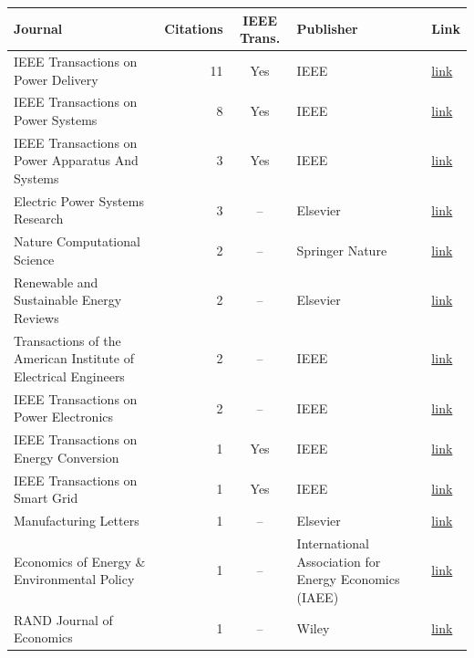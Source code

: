 \begin{table}[htbp]
\centering
\small
\begin{tabular}{lrcll}
\toprule
Journal & Citations & IEEE Trans. & Publisher & Link \\
\midrule
    IEEE Transactions on Power Delivery & 11 & Yes & IEEE & \href{https://ieeexplore.ieee.org/xpl/RecentIssue.jsp?punumber=61}{link} \\
    IEEE Transactions on Power Systems & 8 & Yes & IEEE & \href{https://ieeexplore.ieee.org/xpl/RecentIssue.jsp?punumber=59}{link} \\
    IEEE Transactions on Power Apparatus And Systems & 3 & Yes & IEEE & \href{https://ieeexplore.ieee.org/xpl/RecentIssue.jsp?punumber=6115846}{link} \\
    Electric Power Systems Research & 3 & -- & Elsevier & \href{https://www.sciencedirect.com/journal/electric-power-systems-research}{link} \\
    Nature Computational Science & 2 & -- & Springer Nature & \href{https://www.nature.com/natcomputsci/}{link} \\
    Renewable and Sustainable Energy Reviews & 2 & -- & Elsevier & \href{https://www.sciencedirect.com/journal/renewable-and-sustainable-energy-reviews}{link} \\
    Transactions of the American Institute of Electrical Engineers & 2 & -- & IEEE & \href{https://ieeexplore.ieee.org/xpl/RecentIssue.jsp?punumber=4763772}{link} \\
    IEEE Transactions on Power Electronics & 2 & -- & IEEE & \href{https://ieeexplore.ieee.org/xpl/RecentIssue.jsp?punumber=63}{link} \\
    IEEE Transactions on Energy Conversion & 1 & Yes & IEEE & \href{https://ieeexplore.ieee.org/xpl/RecentIssue.jsp?punumber=60}{link} \\
    IEEE Transactions on Smart Grid & 1 & Yes & IEEE & \href{https://ieeexplore.ieee.org/xpl/RecentIssue.jsp?punumber=5165411}{link} \\
    Manufacturing Letters & 1 & -- & Elsevier & \href{https://www.sciencedirect.com/journal/manufacturing-letters}{link} \\
    Economics of Energy \& Environmental Policy & 1 & -- & International Association for Energy Economics (IAEE) & \href{https://www.iaee.org/en/publications/eeepjournal.aspx}{link} \\
    RAND Journal of Economics & 1 & -- & Wiley & \href{https://onlinelibrary.wiley.com/journal/17562171}{link} \\

\end{tabular}
\end{table}
